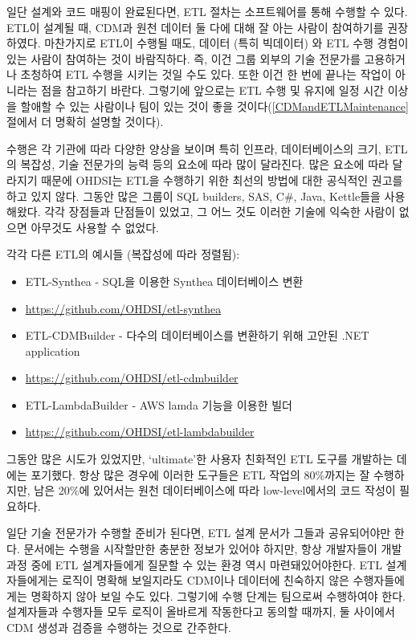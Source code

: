 \documentclass[11pt]{book}
\providecommand{\tightlist}{%
  \setlength{\itemsep}{0pt}\setlength{\parskip}{0pt}}
\theoremstyle{definition}
\theoremstyle{definition}
\theoremstyle{definition}
\theoremstyle{remark}
\begin{document}
일단 설계와 코드 매핑이 완료된다면, ETL 절차는 소프트웨어를 통해 수행할
수 있다. ETL이 설계될 때, CDM과 원천 데이터 둘 다에 대해 잘 아는 사람이
참여하기를 권장하였다. 마찬가지로 ETL이 수행될 때도, 데이터 (특히
빅데이터) 와 ETL 수행 경험이 있는 사람이 참여하는 것이 바람직하다. 즉,
이건 그룹 외부의 기술 전문가를 고용하거나 초청하여 ETL 수행을 시키는
것일 수도 있다. 또한 이건 한 번에 끝나는 작업이 아니라는 점을 참고하기
바란다. 그렇기에 앞으로는 ETL 수행 및 유지에 일정 시간 이상을 할애할 수
있는 사람이나 팀이 있는 것이 좋을
것이다(\ref{CDMandETLMaintenance}절에서 더 명확히 설명할 것이다).

수행은 각 기관에 따라 다양한 양상을 보이며 특히 인프라, 데이터베이스의
크기, ETL의 복잡성, 기술 전문가의 능력 등의 요소에 따라 많이 달라진다.
많은 요소에 따라 달라지기 때문에 OHDSI는 ETL을 수행하기 위한 최선의
방법에 대한 공식적인 권고를 하고 있지 않다. 그동안 많은 그룹이 SQL
builders, SAS, C\#, Java, Kettle들을 사용해왔다. 각각 장점들과 단점들이
있었고, 그 어느 것도 이러한 기술에 익숙한 사람이 없으면 아무것도 사용할
수 없었다.

각각 다른 ETL의 예시들 (복잡성에 따라 정렬됨):

\begin{itemize}
\tightlist
\item
  ETL-Synthea - SQL을 이용한 Synthea 데이터베이스 변환
\item
  \url{https://github.com/OHDSI/etl-synthea}
\item
  ETL-CDMBuilder - 다수의 데이터베이스를 변환하기 위해 고안된 .NET
  application
\item
  \url{https://github.com/OHDSI/etl-cdmbuilder}
\item
  ETL-LambdaBuilder - AWS lamda 기능을 이용한 빌더
\item
  \url{https://github.com/OHDSI/etl-lambdabuilder}
\end{itemize}

그동안 많은 시도가 있었지만, `ultimate'한 사용자 친화적인 ETL 도구를
개발하는 데에는 포기했다. 항상 많은 경우에 이러한 도구들은 ETL 작업의
80\%까지는 잘 수행하지만, 남은 20\%에 있어서는 원천 데이터베이스에 따라
low-level에서의 코드 작성이 필요하다.

일단 기술 전문가가 수행할 준비가 된다면, ETL 설계 문서가 그들과
공유되어야만 한다. 문서에는 수행을 시작할만한 충분한 정보가 있어야
하지만, 항상 개발자들이 개발 과정 중에 ETL 설계자들에게 질문할 수 있는
환경 역시 마련돼있어야한다. ETL 설계자들에게는 로직이 명확해 보일지라도
CDM이나 데이터에 친숙하지 않은 수행자들에게는 명확하지 않아 보일 수도
있다. 그렇기에 수행 단계는 팀으로써 수행하여야 한다. 설계자들과 수행자들
모두 로직이 올바르게 작동한다고 동의할 때까지, 둘 사이에서 CDM 생성과
검증을 수행하는 것으로 간주한다.
\end{document}
